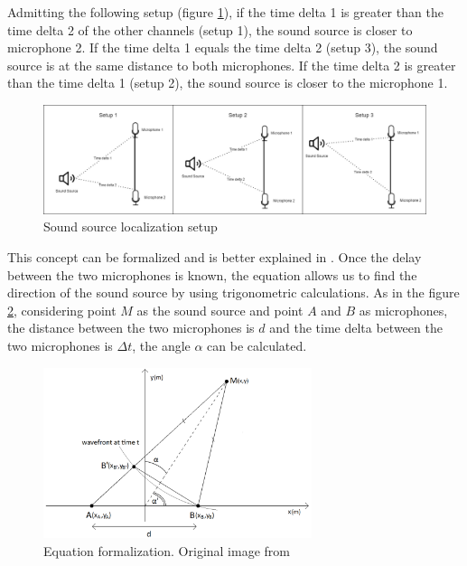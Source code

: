 Admitting the following setup (figure \ref*{fig:microphones_setup}), if the time delta 1 is greater than the time delta 2 of the other channels (setup 1), the sound source is closer to microphone 2. If the time delta 1 equals the time delta 2 (setup 3), the sound source is at the same distance to both microphones. If the time delta 2 is greater than the time delta 1 (setup 2), the sound source is closer to the microphone 1. 

\begin{figure}[H]
    \centering
    \includegraphics[width=1\textwidth]{../Images/microphones_setups.png}
    \caption{Sound source localization setup}
    \label{fig:microphones_setup}
\end{figure}

This concept can be formalized and is better explained in \cite{Scola2010DirectionOA}. Once the delay between the two microphones is known, the equation allows us to find the direction of the sound source by using trigonometric calculations. As in the figure \ref*{fig:sound-source-from-two-microphones}, considering point $M$ as the sound source and point $A$ and $B$ as microphones, the distance between the two microphones is $d$ and the time delta between the two microphones is $\Delta t$, the angle $\alpha$ can be calculated.

\begin{figure}[H]
    \centering
    \includegraphics[width=0.7\textwidth]{../Images/sound-source-from-two-microphones.png}
    \caption{Equation formalization. Original image from \cite{Scola2010DirectionOA}}
    \label{fig:sound-source-from-two-microphones}
\end{figure}

